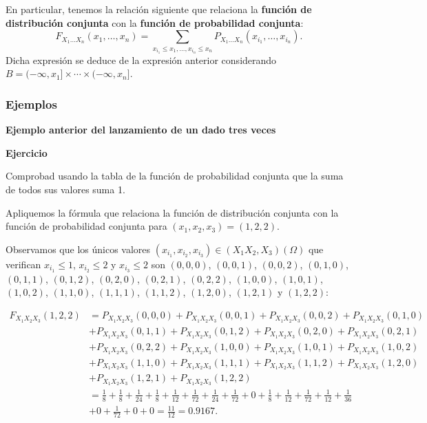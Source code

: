 \documentclass[]{book}
\begin{document}
En particular, tenemos la relación siguiente que relaciona la \textbf{función de distribución conjunta} con la \textbf{función de probabilidad conjunta}:
\[
F_{X_1\ldots X_n}(x_1,\ldots,x_n)=\sum_{x_{i_1}\leq x_1,\ldots, x_{i_n}\leq x_n} P_{X_1\ldots X_n}(x_{i_1},\ldots,x_{i_n}).
\]
Dicha expresión se deduce de la expresión anterior considerando \(B=(-\infty,x_1]\times\cdots\times (-\infty,x_n]\).

\hypertarget{ejemplos-10}{%
\subsubsection{Ejemplos}\label{ejemplos-10}}

\textbf{Ejemplo anterior del lanzamiento de un dado tres veces}

\textbf{Ejercicio}

Comprobad usando la tabla de la función de probabilidad conjunta que la suma de todos sus valores suma 1.

Apliquemos la fórmula que relaciona la función de distribución conjunta con la función de probabilidad conjunta para \((x_1,x_2,x_3)=(1,2,2)\).

Observamos que los únicos valores \((x_{i_1},x_{i_2},x_{i_3})\in (X_1 X_2,X_3)(\Omega)\) que verifican \(x_{i_1}\leq 1\), \(x_{i_2}\leq 2\) y \(x_{i_3}\leq 2\) son \((0,0,0)\), \((0,0,1)\), \((0,0,2)\), \((0,1,0)\), \((0,1,1)\), \((0,1,2)\), \((0,2,0)\), \((0,2,1)\), \((0,2,2)\), \((1,0,0)\), \((1,0,1)\), \((1,0,2)\), \((1,1,0)\), \((1,1,1)\), \((1,1,2)\), \((1,2,0)\), \((1,2,1)\) y \((1,2,2)\):

\[
\begin{array}{rl}
F_{X_1X_2X_3}(1,2,2) & =P_{X_1X_2X_3}(0,0,0)+P_{X_1X_2X_3}(0,0,1)+P_{X_1X_2X_3}(0,0,2)+P_{X_1X_2X_3}(0,1,0)\\ & +P_{X_1X_2X_3}(0,1,1)+P_{X_1X_2X_3}(0,1,2)+P_{X_1X_2X_3}(0,2,0)+P_{X_1X_2X_3}(0,2,1)\\ & +P_{X_1X_2X_3}(0,2,2) +
P_{X_1X_2X_3}(1,0,0)+P_{X_1X_2X_3}(1,0,1)+P_{X_1X_2X_3}(1,0,2)\\ & +P_{X_1X_2X_3}(1,1,0)+P_{X_1X_2X_3}(1,1,1)+
P_{X_1X_2X_3}(1,1,2)+P_{X_1X_2X_3}(1,2,0)\\ & + P_{X_1X_2X_3}(1,2,1)+P_{X_1X_2X_3}(1,2,2)\\ &=
\frac{1}{8}+\frac{1}{8}+\frac{1}{24}+\frac{1}{8}+\frac{1}{12}+\frac{1}{72}+\frac{1}{24}+\frac{1}{72}+0+\frac{1}{8}+\frac{1}{12}+\frac{1}{72}+\frac{1}{12}+\frac{1}{36}\\ & +0+\frac{1}{72}+0+0=\frac{11}{12}=0.9167.
\end{array}
\]
\end{document}
